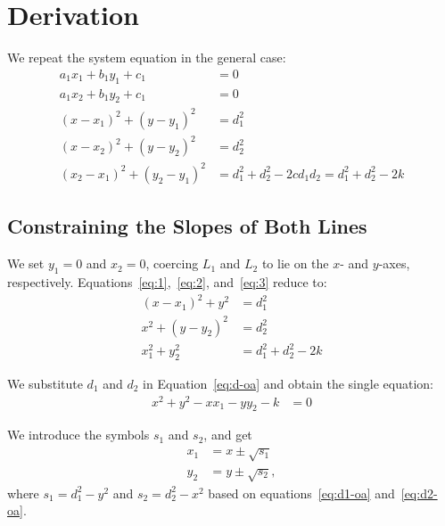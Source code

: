 \section{Derivation}
\label{sec:derivation}
We repeat the system equation in the general case:
\begin{align}
  a_1 x_1 + b_1 y_1 + c_1 &= 0\\
  a_1 x_2 + b_1 y_2 + c_1 &= 0\\
  (x - x_1)^2 + (y - y_1)^2 &= d_1^2\label{eq:1}\\
  (x - x_2)^2 + (y - y_2)^2 &= d_2^2\label{eq:2}\\
  (x_2 - x_1)^2 + (y_2 - y_1)^2 &= d_1^2 + d_2^2 - 2 c d_1 d_2 = d_1^2 + d_2^2 - 2 k\label{eq:3}
\end{align}

\subsection{Constraining the Slopes of Both Lines}
\label{ssec:derivation-constraining-slopes}
We set $y_1 = 0$ and $x_2 = 0$, coercing $L_1$ and $L_2$ to lie on the
$x$- and $y$-axes, respectively.
Equations~\ref{eq:1},~\ref{eq:2}, and~\ref{eq:3} reduce to:
\begin{align}
  (x - x_1)^2 + y^2 &= d_1^2\label{eq:d1-oa}\\
  x^2 + (y - y_2)^2 &= d_2^2\label{eq:d2-oa}\\
  x_1^2 + y_2^2 &= d_1^2 + d_2^2 - 2 k\label{eq:d-oa}
\end{align}

\noindent
We substitute $d_1$ and $d_2$ in Equation~\ref{eq:d-oa} and obtain the single equation:
\begin{align}
  x^2 + y^2 - x x_1 - y y_2 - k &= 0\label{eq:s-oa}
\end{align}

\noindent
We introduce the symbols $s_1$ and $s_2$, and get
\begin{align*}
  x_1 &= x \pm \sqrt{s_1}\\
  y_2 &= y \pm \sqrt{s_2},
\end{align*}
where $s_1 = d_1^2 - y^2$ and $s_2 = d_2^2 - x^2$ based on equations~\ref{eq:d1-oa} and~\ref{eq:d2-oa}.

